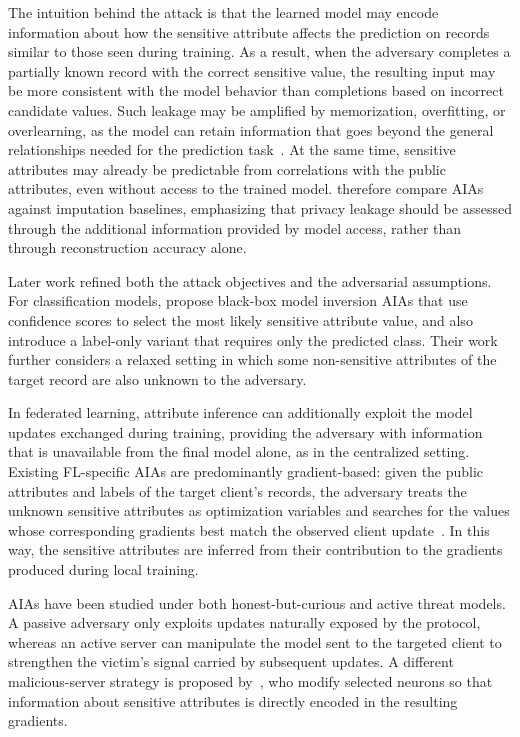 The intuition behind the attack is that the learned model may encode information about how the sensitive attribute affects the prediction on records similar to those seen during training. As a result, when the adversary completes a partially known record with the correct sensitive value, the resulting input may be more consistent with the model behavior than completions based on incorrect candidate values. Such leakage may be amplified by memorization, overfitting, or overlearning, as the model can retain information that goes beyond the general relationships needed for the prediction task~\cite{yeom2018privacyriskmachinelearning,Song2020Overlearning}. At the same time, sensitive attributes may already be predictable from correlations with the public attributes, even without access to the trained model.  therefore compare AIAs against imputation baselines, emphasizing that privacy leakage should be assessed through the additional information provided by model access, rather than through reconstruction accuracy alone.

Later work refined both the attack objectives and the adversarial assumptions. For classification models,  propose black-box model inversion AIAs that use confidence scores to select the most likely sensitive attribute value, and also introduce a label-only variant that requires only the predicted class. Their work further considers a relaxed setting in which some non-sensitive attributes of the target record are also unknown to the adversary.

In federated learning, attribute inference can additionally exploit the model updates exchanged during training, providing the adversary with information that is unavailable from the final model alone, as in the centralized setting. Existing FL-specific AIAs are predominantly gradient-based: given the public attributes and labels of the target client's records, the adversary treats the unknown sensitive attributes as optimization variables and searches for the values whose corresponding gradients best match the observed client update~\cite{lyu2021novelattributereconstructionattack,chen2024practical}. In this way, the sensitive attributes are inferred from their contribution to the gradients produced during local training.

AIAs have been studied under both honest-but-curious and active threat models. A passive adversary only exploits updates naturally exposed by the protocol, whereas an active server can manipulate the model sent to the targeted client to strengthen the victim's signal carried by subsequent updates. A different malicious-server strategy is proposed by~, who modify selected neurons so that information about sensitive attributes is directly encoded in the resulting gradients.

